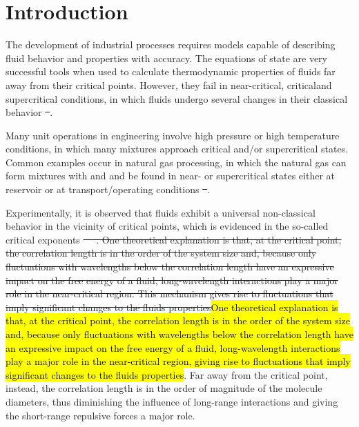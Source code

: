 \documentclass[preprint,12pt,3p]{elsarticle}
\providecommand{\DIFadd}[1]{{\protect\color{blue}\uwave{#1}}} %
\providecommand{\DIFdel}[1]{{\protect\color{red}\sout{#1}}}                      %
\providecommand{\DIFaddbegin}{} %
\providecommand{\DIFaddend}{} %
\providecommand{\DIFdelbegin}{} %
\providecommand{\DIFdelend}{} %
\begin{document}
\section{Introduction}

    The development of industrial processes requires models capable of describing fluid behavior and properties with accuracy. The equations of state are very successful tools when used to calculate thermodynamic properties of fluids far away from their critical points. However, they fail in near-critical, critical\DIFaddbegin \DIFadd{, }\DIFaddend and supercritical conditions, in which fluids undergo several changes in their classical behavior \DIFdelbegin \DIFdel{~}\DIFdelend \cite{sengers1986thermodynamic}.

	Many unit operations in engineering involve high pressure or high temperature conditions, in which many mixtures approach critical and/or supercritical states. Common examples occur in natural gas processing, in which the natural gas can form mixtures with  and \DIFdelbegin \DIFdel{ }\DIFdelend \DIFaddbegin \DIFadd{\ce{H_2} }\DIFaddend and be found in near- or supercritical states either at reservoir or at transport/operating conditions \DIFdelbegin \DIFdel{~}\DIFdelend \citep{kermani2003carbon}.

    Experimentally, it is observed that fluids exhibit a universal non-classical behavior in the vicinity of critical points, which is evidenced in the so-called critical exponents \DIFdelbegin \DIFdel{~\mbox{%
\citep{carles2010brief}}%
. One theoretical explanation is that, at the critical point, the correlation length is in the order of the system size and, because only fluctuations with wavelengths below the correlation length have an expressive impact on the free energy of a fluid, long-wavelength interactions play a major role in the near-critical region. This mechanism gives rise to fluctuations that imply significant changes to the fluids properties}\DIFdelend \DIFaddbegin \DIFadd{\mbox{%
\cite{carles2010brief}}%
. }\hl{One theoretical explanation is that, at the critical point, the correlation length is in the order of the system size and, because only fluctuations with wavelengths below the correlation length have an expressive impact on the free energy of a fluid, long-wavelength interactions play a major role in the near-critical region, giving rise to fluctuations that imply significant changes to the fluids properties}\DIFaddend . Far away from the critical point, instead, the correlation length is in the order of magnitude of the molecule diameters, thus diminishing the influence of long-range interactions and giving the short-range repulsive forces a major role.
\end{document}
